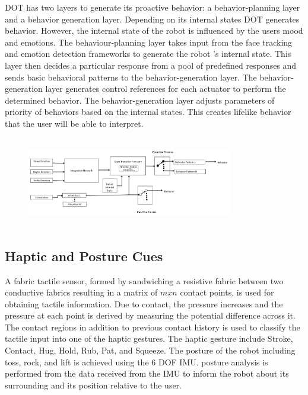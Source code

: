 \documentclass[letterpaper, 10 pt, conference]{ieeeconf}  %
\begin{document}
DOT has two layers to generate its proactive behavior: a behavior-planning layer and a behavior generation layer. Depending on its internal states DOT generates behavior. However, the internal state
of the robot is influenced by the users mood and emotions. The behaviour-planning layer takes input from the face tracking and emotion detection frameworks to generate the robot 's internal state. This layer then decides a particular response from a pool of predefined responses and sends basic behavioral
patterns to the behavior-generation layer. The behavior-generation layer generates control references for each actuator to perform the determined behavior. The behavior-generation layer adjusts parameters of priority of behaviors based on the internal states. This creates lifelike behavior that the user will be able to interpret.

\begin{figure}
\centering
    \includegraphics[width=9cm,height=4cm]{frame.png}
\end{figure}

\subsection{Haptic and Posture Cues}

A fabric tactile sensor, formed by sandwiching a resistive fabric between two conductive fabrics resulting in a matrix of $mxn$ contact points, is used for obtaining tactile information. Due to contact, the pressure increases and the pressure at each point is derived by measuring the potential difference across it. The contact regions in addition to previous contact history is used to classify the tactile input into one of the haptic gestures. The haptic gesture include Stroke, Contact, Hug, Hold, Rub, Pat, and Squeeze. The posture of the robot including toss, rock, and lift is achieved using the 6 DOF IMU. posture analysis is performed from the data received from the IMU to inform the robot about its surrounding and its position relative to the user.
\end{document}
